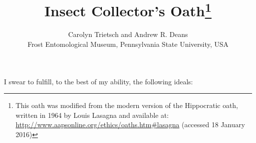 \documentclass[letterpaper, 10pt]{article}
\begin{document}
\pagestyle{fancy}
\lhead{}
\chead{}
\rhead{}
\lfoot{}
\cfoot{}
\rfoot{\thepage}
\cleanlookdateon

\title{Insect Collector's Oath\footnote{This oath was modified from the modern version of the Hippocratic oath, written in 1964 by Louis Lasagna and available at: \url{http://www.aapsonline.org/ethics/oaths.htm\#lasagna} (accessed 18 January 2016)}}
\author{Carolyn Trietsch and Andrew R. Deans\\
Frost Entomological Museum, Pennsylvania State University, USA}

\maketitle
\thispagestyle{empty}
\noindent{}I swear to fulfill, to the best of my ability, the following ideals:
\end{document}
